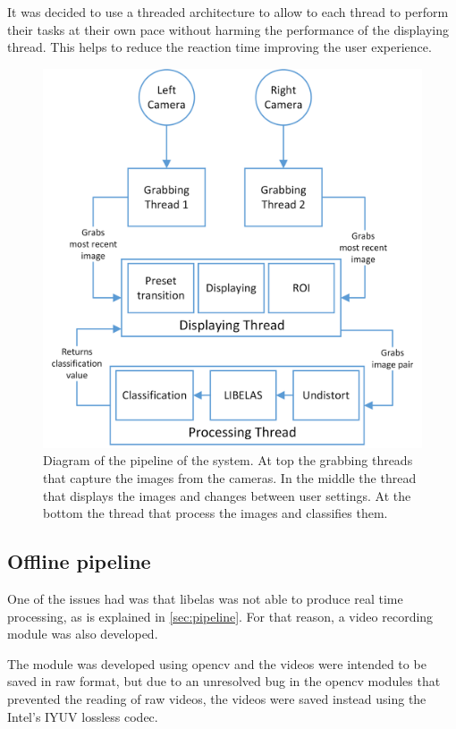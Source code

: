 \documentclass[10pt,a4paper,twocolumn,twoside]{article}
\begin{document}
	It was decided to use a threaded architecture to allow to each thread to perform their tasks at their own pace without harming the performance of the displaying thread. This helps to reduce the reaction time improving the user experience.  
	
	\begin{figure}
		\centering
		\includegraphics[width=1\linewidth]{img/pipeline.png}
		\caption{Diagram of the pipeline of the system. At top the grabbing threads that capture the images from the cameras. In the middle the thread that displays the images and changes between user settings. At the bottom the thread that process the images and classifies them.   }
		\label{fig:pipeline}
	\end{figure}
	
	
	\subsection{Offline pipeline}
	One of the issues had was that libelas was not able to produce real time processing, as is explained in \ref{sec:pipeline}. For that reason, a video recording module was also developed.  
	
	The module was developed using opencv and the videos were intended to be saved in raw format, but due to an unresolved bug in the opencv modules that prevented the reading of raw videos, the videos were saved instead using the Intel's IYUV lossless codec. 
	
\end{document}
